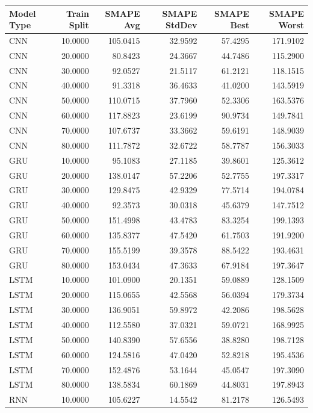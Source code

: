 \begin{tabular}{lrrrrr}
\toprule
Model Type & Train Split & SMAPE Avg & SMAPE StdDev & SMAPE Best & SMAPE Worst \\
\midrule
CNN & 10.0000 & 105.0415 & 32.9592 & 57.4295 & 171.9102 \\
CNN & 20.0000 & 80.8423 & 24.3667 & 44.7486 & 115.2900 \\
CNN & 30.0000 & 92.0527 & 21.5117 & 61.2121 & 118.1515 \\
CNN & 40.0000 & 91.3318 & 36.4633 & 41.0200 & 143.5919 \\
CNN & 50.0000 & 110.0715 & 37.7960 & 52.3306 & 163.5376 \\
CNN & 60.0000 & 117.8823 & 23.6199 & 90.9734 & 149.7841 \\
CNN & 70.0000 & 107.6737 & 33.3662 & 59.6191 & 148.9039 \\
CNN & 80.0000 & 111.7872 & 32.6722 & 58.7787 & 156.3033 \\
GRU & 10.0000 & 95.1083 & 27.1185 & 39.8601 & 125.3612 \\
GRU & 20.0000 & 138.0147 & 57.2206 & 52.7755 & 197.3317 \\
GRU & 30.0000 & 129.8475 & 42.9329 & 77.5714 & 194.0784 \\
GRU & 40.0000 & 92.3573 & 30.0318 & 45.6379 & 147.7512 \\
GRU & 50.0000 & 151.4998 & 43.4783 & 83.3254 & 199.1393 \\
GRU & 60.0000 & 135.8377 & 47.5420 & 61.7503 & 191.9200 \\
GRU & 70.0000 & 155.5199 & 39.3578 & 88.5422 & 193.4631 \\
GRU & 80.0000 & 153.0434 & 47.3633 & 67.9184 & 197.3647 \\
LSTM & 10.0000 & 101.0900 & 20.1351 & 59.0889 & 128.1509 \\
LSTM & 20.0000 & 115.0655 & 42.5568 & 56.0394 & 179.3734 \\
LSTM & 30.0000 & 136.9051 & 59.8972 & 42.2086 & 198.5628 \\
LSTM & 40.0000 & 112.5580 & 37.0321 & 59.0721 & 168.9925 \\
LSTM & 50.0000 & 140.8390 & 57.6556 & 38.8280 & 198.7128 \\
LSTM & 60.0000 & 124.5816 & 47.0420 & 52.8218 & 195.4536 \\
LSTM & 70.0000 & 152.4876 & 53.1644 & 45.0547 & 197.3090 \\
LSTM & 80.0000 & 138.5834 & 60.1869 & 44.8031 & 197.8943 \\
RNN & 10.0000 & 105.6227 & 14.5542 & 81.2178 & 126.5493 \\

\end{tabular}
